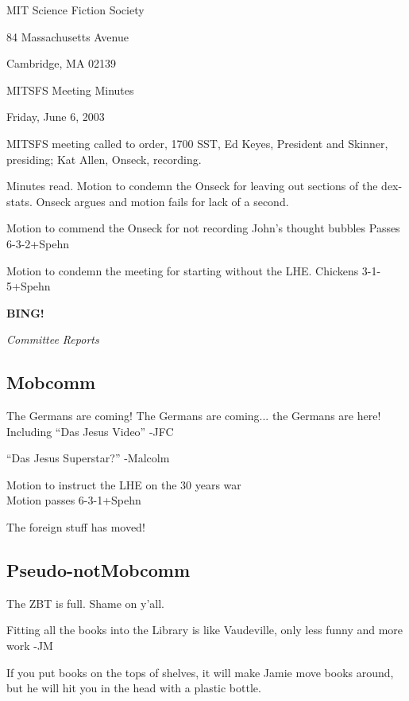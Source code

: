\documentclass[12pt]{article}
\newcommand{\bing}{{\bf BING!} }
\newcommand{\goto}[1]{\bing \vskip 12pt \centerline{{\em{#1}}}}
\begin{document}
\begin{center}

MIT Science Fiction Society 

84 Massachusetts Avenue

Cambridge, MA 02139

\vspace{12pt}

MITSFS Meeting Minutes 

Friday, June 6, 2003

\end{center}
 
\vspace{18pt}

\setlength{\parskip}{6pt}

\noindent
MITSFS meeting called to order, 1700 SST, Ed Keyes, President and
Skinner, presiding; Kat Allen,  Onseck, recording.

Minutes read.
Motion to condemn the Onseck for leaving out sections of the
dex-stats. Onseck argues and motion fails for lack of a second.

Motion to commend the Onseck for not recording John's thought bubbles
Passes 6-3-2+Spehn

Motion to condemn the meeting for starting without the LHE.
Chickens 3-1-5+Spehn


\goto{Committee Reports}

\subsection*{Mobcomm}
The Germans are coming! The Germans are coming... the Germans are here!
Including ``Das Jesus Video'' -JFC

``Das Jesus Superstar?'' -Malcolm

Motion to instruct the LHE on the 30 years war\\
Motion passes 6-3-1+Spehn

The foreign stuff has moved!

\subsection*{Pseudo-notMobcomm}
The ZBT is full. Shame on y'all.

Fitting all the books into the Library is like Vaudeville, only less
funny and more work -JM

If you put books on the tops of shelves, it will make Jamie move books
around, but he will hit you in the head with a plastic bottle.
\end{document}
